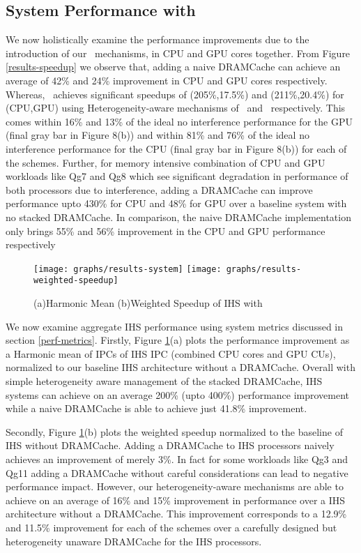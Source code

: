 \subsection{System Performance with \cachename}
We now holistically examine the performance improvements due to the introduction of our \cachename\ mechanisms, in  CPU and GPU cores together. From Figure \ref{results-speedup} we observe that, adding a naive DRAMCache can achieve an average of 42\% and 24\% improvement in CPU and GPU cores respectively. Whereas, \cachename\ achieves significant speedups of (205\%,17.5\%) and (211\%,20.4\%) for (CPU,GPU) using Heterogeneity-aware mechanisms of \bypassname\ and \chaining\ respectively. This comes within 16\% and 13\% of the ideal no interference performance for the GPU (final gray bar in Figure 8(b)) and within 81\% and 76\% of the ideal no interference performance for the CPU (final gray bar in Figure 8(b)) for each of the schemes. Further, for memory intensive combination of CPU and GPU workloads like Qg7 and Qg8 which see significant degradation in performance of both processors due to interference, adding a DRAMCache can improve performance upto 430\% for CPU and 48\% for GPU over a baseline system with no stacked DRAMCache. In comparison, the naive DRAMCache implementation only brings 55\% and 56\% improvement in the CPU and GPU performance respectively
\begin{figure}[!htb]
	\centering
	\texttt{[image: graphs/results-system]}
	\texttt{[image: graphs/results-weighted-speedup]}
	\caption{(a)Harmonic Mean (b)Weighted Speedup of IHS with \cachename}
	\label{results-system}
\end{figure}
\par We now examine aggregate IHS performance using system metrics discussed in section \ref{perf-metrics}. Firstly, Figure \ref{results-system}(a) plots the performance improvement as a Harmonic mean of IPCs of IHS IPC (combined CPU cores and GPU CUs), normalized to our baseline IHS architecture without a DRAMCache. Overall with simple heterogeneity aware management of the stacked DRAMCache, IHS systems can achieve on an average 200\% (upto 400\%) performance improvement while a naive DRAMCache is able to achieve just 41.8\% improvement.
\par Secondly, Figure \ref{results-system}(b) plots the weighted speedup normalized to the baseline of IHS without DRAMCache. Adding a DRAMCache to IHS processors naively achieves an improvement of merely 3\%. In fact for some workloads like Qg3 and Qg11 adding a DRAMCache without careful considerations can lead to negative performance impact. However, our heterogeneity-aware mechanisms are able to achieve on an average of 16\% and 15\%  improvement in performance over a IHS architecture without a DRAMCache. This improvement corresponds to a 12.9\% and 11.5\% improvement for each of the schemes over a carefully designed but heterogeneity unaware DRAMCache for the IHS processors.


